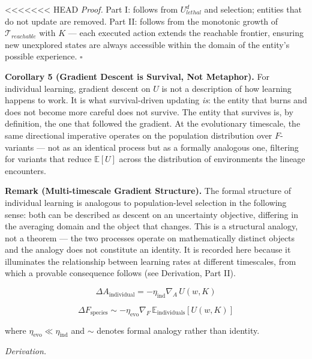 \documentclass[
]{article}
\begin{document}
<<<<<<< HEAD
\emph{Proof.} Part I: follows from \(U_{lethal}^d\) and selection;
entities that do not update are removed. Part II: follows from the
monotonic growth of \(\mathcal{T}_{reachable}\) with \(K\) --- each
executed action extends the reachable frontier, ensuring new unexplored
states are always accessible within the domain of the entity's possible
experience. \(\square\)

\textbf{Corollary 5 (Gradient Descent is Survival, Not Metaphor).} For
individual learning, gradient descent on \(U\) is not a description of
how learning happens to work. It is what survival-driven updating
\emph{is}: the entity that burns and does not become more careful does
not survive. The entity that survives is, by definition, the one that
followed the gradient. At the evolutionary timescale, the same
directional imperative operates on the population distribution over
\(F\)-variants --- not as an identical process but as a formally
analogous one, filtering for variants that reduce \(\mathbb{E}[U]\)
across the distribution of environments the lineage encounters.

\textbf{Remark (Multi-timescale Gradient Structure).} The formal
structure of individual learning is analogous to population-level
selection in the following sense: both can be described as descent on an
uncertainty objective, differing in the averaging domain and the object
that changes. This is a structural analogy, not a theorem --- the two
processes operate on mathematically distinct objects and the analogy
does not constitute an identity. It is recorded here because it
illuminates the relationship between learning rates at different
timescales, from which a provable consequence follows (see Derivation,
Part II).

\[\Delta A_{\text{individual}} = -\eta_{\text{ind}} \nabla_A \, U(w, K)\]

\[\Delta F_{\text{species}} \sim -\eta_{\text{evo}} \nabla_F \, \mathbb{E}_{\text{individuals}}\left[U(w, K)\right]\]

where \(\eta_{\text{evo}} \ll \eta_{\text{ind}}\) and \(\sim\) denotes
formal analogy rather than identity.

\emph{Derivation.}
\end{document}
